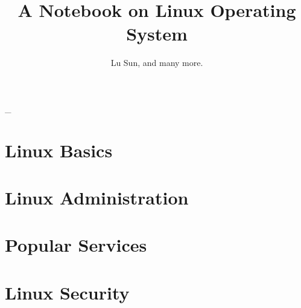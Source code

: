

\makeindex



\frontmatter

\title{A Notebook on Linux Operating System}
\author{Lu Sun, and many more.}

\maketitle


\tableofcontents


\listoffigures
\listoftables

\mainmatter\_

\part{Linux Basics}







\part{Linux Administration}




\part{Popular Services}
 









\part{Linux Security}



\appendix








\printindex


